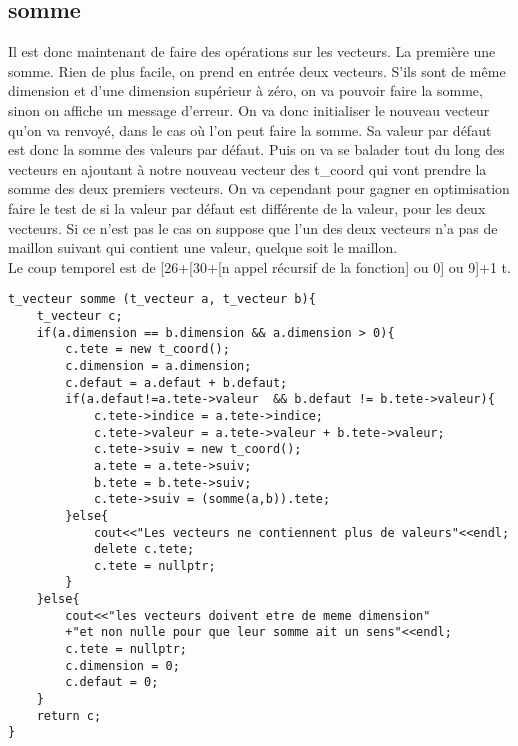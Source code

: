 \documentclass[a4paper,11pt,final]{article}
\begin{document}
\subsection{somme}
Il est donc maintenant de faire des opérations sur les vecteurs. La première une somme. Rien de plus facile, on prend en entrée deux vecteurs. S'ils sont de même dimension et d'une dimension supérieur à zéro, on va pouvoir faire la somme, sinon on affiche un message d'erreur. On va donc initialiser le nouveau vecteur qu'on va renvoyé, dans le cas où l'on peut faire la somme. Sa valeur par défaut est donc la somme des valeurs par défaut. Puis on va se balader tout du long des vecteurs en ajoutant à notre nouveau vecteur des t\_coord qui vont prendre la somme des deux premiers vecteurs. On va cependant pour gagner en optimisation faire le test de si la valeur par défaut est différente de la valeur, pour les deux vecteurs. Si ce n'est pas le cas on suppose que l'un des deux vecteurs n'a pas de maillon suivant qui contient une valeur, quelque soit le maillon.
\\ Le coup temporel est de [26+[30+[n appel récursif de la fonction] ou 0] ou 9]+1 t.

\pagebreak
\begin{verbatim}
t_vecteur somme (t_vecteur a, t_vecteur b){
    t_vecteur c;
    if(a.dimension == b.dimension && a.dimension > 0){
        c.tete = new t_coord();
        c.dimension = a.dimension;
        c.defaut = a.defaut + b.defaut;
        if(a.defaut!=a.tete->valeur  && b.defaut != b.tete->valeur){
            c.tete->indice = a.tete->indice;
            c.tete->valeur = a.tete->valeur + b.tete->valeur;
            c.tete->suiv = new t_coord();
            a.tete = a.tete->suiv;
            b.tete = b.tete->suiv;
            c.tete->suiv = (somme(a,b)).tete;
        }else{
            cout<<"Les vecteurs ne contiennent plus de valeurs"<<endl; 
            delete c.tete;
            c.tete = nullptr;      
        }
    }else{
        cout<<"les vecteurs doivent etre de meme dimension"
        +"et non nulle pour que leur somme ait un sens"<<endl;
        c.tete = nullptr;
        c.dimension = 0;
        c.defaut = 0;
    }
    return c;
}
\end{verbatim}
\end{document}
